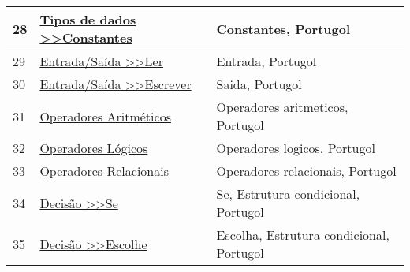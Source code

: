 \begin{longtable}{| p{} | p{} | p{} |}
28  & \href{http://www.dei.estt.ipt.pt/portugol/node/10}{\color{blue} Tipos de dados \textgreater{}\textgreater Constantes                                } & Constantes, Portugol                                                                                                                              \\ \hline
29  & \href{http://www.dei.estt.ipt.pt/portugol/node/14}{\color{blue} Entrada/Saída \textgreater{}\textgreater Ler                                        } & Entrada, Portugol                                                                                                                                 \\ \hline
30  & \href{http://www.dei.estt.ipt.pt/portugol/node/15}{\color{blue} Entrada/Saída \textgreater{}\textgreater Escrever                                   } & Saida, Portugol                                                                                                                                   \\ \hline
31  & \href{http://www.dei.estt.ipt.pt/portugol/node/17}{\color{blue} Operadores Aritméticos                                                              } & Operadores aritmeticos, Portugol                                                                                                                  \\ \hline
32  & \href{http://www.dei.estt.ipt.pt/portugol/node/21}{\color{blue} Operadores Lógicos                                                                  } & Operadores logicos, Portugol                                                                                                                      \\ \hline
33  & \href{http://www.dei.estt.ipt.pt/portugol/node/22}{\color{blue} Operadores Relacionais                                                              } & Operadores relacionais, Portugol                                                                                                                  \\ \hline
34  & \href{http://www.dei.estt.ipt.pt/portugol/node/24}{\color{blue} Decisão \textgreater{}\textgreater Se                                               } & Se, Estrutura condicional, Portugol                                                                                                               \\ \hline
35  & \href{http://www.dei.estt.ipt.pt/portugol/node/25}{\color{blue} Decisão \textgreater{}\textgreater Escolhe                                          } & Escolha, Estrutura condicional, Portugol                                                                                                          \\ \hline

\end{longtable}
